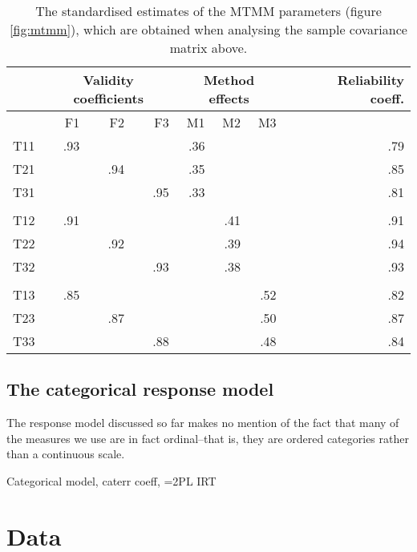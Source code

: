 \documentclass[a4paper,12pt]{article}
\begin{document}
\begin{table}\centering\caption{The standardised estimates of the MTMM parameters (figure \ref{fig:mtmm}), which are obtained when analysing the sample covariance matrix above.\label{tab:mtmm_results}}
\begin{tabular}{lrrrrrrrr}\hline
 &   \multicolumn{3}{c}{Validity coefficients} & \multicolumn{3}{c}{Method effects} &  & Reliability coeff.\\ 
 \hline
    & F1 & F2 & F3 & M1 & M2 & M3 \\ 
T11   & .93 &  &  & .36 &  &  &  & .79 \\ 
T21   &  & .94 &  & .35 &  &  &  & .85 \\ 
T31   &  &  & .95 & .33 &  &  &  & .81 \\ 
 \\ 
T12   & .91 &  &  &  & .41 &  &  & .91 \\ 
T22   &  & .92 &  &  & .39 &  &  & .94     \\ 
T32   &  &  & .93 &  & .38 &  &  & .93 \\ 
 \\ 
T13   & .85 &  &  &  &  & .52 &  & .82 \\ 
T23   &  & .87 &  &  &  & .50 &  & .87\\ 
T33   &  &  & .88 &  &  & .48 &  & .84  \\
\hline
\end{tabular}
\end{table}

\subsection{The categorical response model}

The response model discussed so far makes no mention of the fact that many of the measures we use are in fact ordinal--that is, they are ordered categories rather than a continuous scale. 

Categorical model, caterr coeff, =2PL IRT 

\section{Data}
\end{document}
